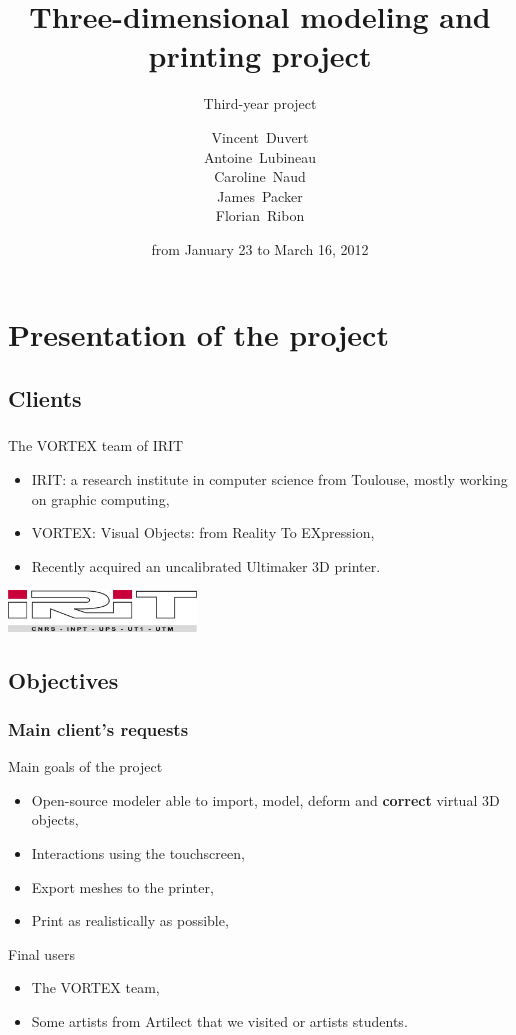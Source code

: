 \documentclass{beamer}
\title{Three-dimensional modeling and printing project}
\subtitle{Third-year project}
\author[V. Duvert, A. Lubineau, C. Naud, J. Packer, F. Ribon]{\scriptsize
Vincent~Duvert \\ Antoine~Lubineau \\ Caroline~Naud \\ James~Packer \\ Florian~Ribon}
\date{from January 23 to March 16, 2012}
\begin{document}
\frame{\titlepage}

\section{Presentation of the project}

\subsection{Clients}
\begin{frame}
	\frametitle{}
	
	\begin{block}{The VORTEX team of IRIT}
		\begin{itemize}
		\item IRIT: a research institute in computer science from Toulouse, mostly working on graphic computing,
		\item VORTEX: Visual Objects: from Reality To EXpression,
		\item Recently acquired an uncalibrated Ultimaker 3D printer.
		\end{itemize}
    \end{block}
    
    \begin{center}
		\includegraphics[width=5cm]{irit}
	\end{center}
    
\end{frame}

\subsection{Objectives}
\begin{frame}
	\frametitle{Main client's requests}
	\begin{block}{Main goals of the project} 
	\begin{itemize}
		\item Open-source modeler able to import, model, deform and \textbf{correct} virtual 3D objects,
		\item Interactions using the touchscreen,
		\item Export meshes to the printer,
		\item Print as realistically as possible,
	\end{itemize}
    \end{block}
    
    \begin{block}{Final users}
    	\begin{itemize}
		\item The VORTEX team,
		\item Some artists from Artilect that we visited or artists students.
		\end{itemize}
    \end{block}

\end{frame}
\end{document}
